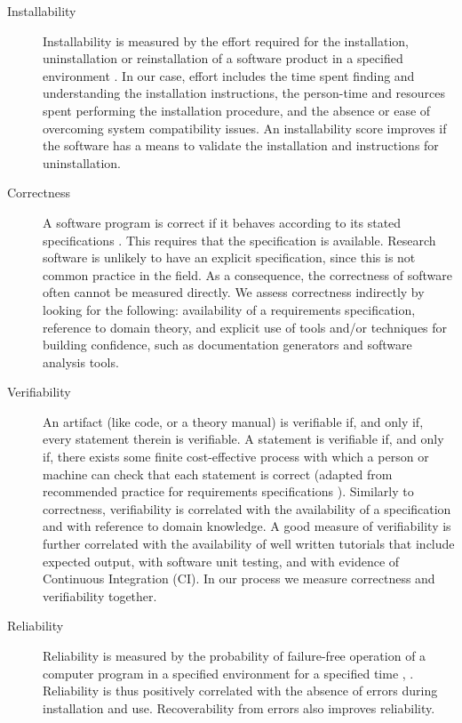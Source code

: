 \documentclass[final, 3p, times, authoryear]{elsarticle}
\begin{document}
\begin{description}

	\item[Installability] Installability is measured by the effort required for
	the installation, uninstallation or reinstallation of a software product in
	a specified environment \citep{ISO/IEC25010, lenhard2013measuring}. In our
	case, effort includes the time spent finding and understanding the
	installation instructions, the person-time and resources spent performing
	the installation procedure, and the absence or ease of overcoming system
	compatibility issues. An installability score improves if the software has a
	means to validate the installation and instructions for uninstallation.
	
	\item[Correctness] A software program is correct if it behaves according to
	its stated specifications \citep[p.\ 17]{GhezziEtAl2003}. This requires that
	the specification is available. Research software is unlikely to have an
	explicit specification, since this is not common practice in the field. As a
	consequence, the correctness of software often cannot be measured directly.
	We assess correctness indirectly by looking for the following: availability
	of a requirements specification, reference to domain theory, and explicit
	use of tools and/or techniques for building confidence, such as
	documentation generators and software analysis tools.
	
	\item[Verifiability] An artifact (like code, or a theory manual) is
	verifiable if, and only if, every statement therein is verifiable. A
	statement is verifiable if, and only if, there exists some finite
	cost-effective process with which a person or machine can check that each
	statement is correct (adapted from recommended practice for requirements
	specifications \citep{IEEE1998}). Similarly to correctness, verifiability is
	correlated with the availability of a specification and with reference to
	domain knowledge. A good measure of verifiability is further correlated with
	the availability of well written tutorials that include expected output,
	with software unit testing, and with evidence of Continuous Integration
	(CI). In our process we measure correctness and verifiability together.
	
	\item[Reliability] Reliability is measured by the probability of
	failure-free operation of a computer program in a specified environment for
	a specified time \citep[p.\ 357]{GhezziEtAl2003}, \citep{musa1987software}.
	Reliability is thus positively correlated with the absence of errors during
	installation and use. Recoverability from errors also improves reliability.
	

\end{description}
\end{document}
